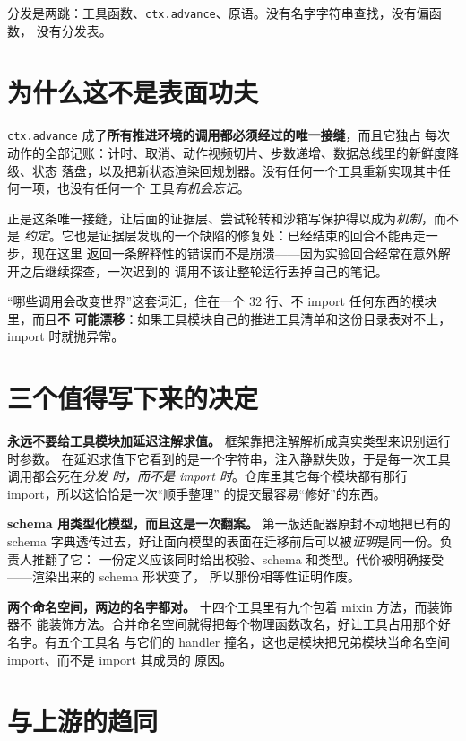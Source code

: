 \documentclass[11pt,a4paper,UTF8,fontset=macnew]{ctexrep}
\newcommand{\keyrule}[1]{\textbf{\textcolor{acc}{#1}}}
\begin{document}
\noindent
分发是两跳：工具函数、\texttt{ctx.advance}、原语。没有名字字符串查找，没有偏函数，
没有分发表。

\section{为什么这不是表面功夫}

\texttt{ctx.advance} 成了\textbf{所有推进环境的调用都必须经过的唯一接缝}，而且它独占
每次动作的全部记账：计时、取消、动作视频切片、步数递增、数据总线里的新鲜度降级、状态
落盘，以及把新状态渲染回规划器。没有任何一个工具重新实现其中任何一项，也没有任何一个
工具\emph{有机会忘记}。

正是这条唯一接缝，让后面的证据层、尝试轮转和沙箱写保护得以成为\emph{机制}，而不是
\emph{约定}。它也是证据层发现的一个缺陷的修复处：已经结束的回合不能再走一步，现在这里
返回一条解释性的错误而不是崩溃——因为实验回合经常在意外解开之后继续探查，一次迟到的
调用不该让整轮运行丢掉自己的笔记。

“哪些调用会改变世界”这套词汇，住在一个 32 行、不 import 任何东西的模块里，而且\textbf{不
可能漂移}：如果工具模块自己的推进工具清单和这份目录表对不上，import 时就抛异常。

\section{三个值得写下来的决定}

\keyrule{永远不要给工具模块加延迟注解求值。} 框架靠把注解解析成真实类型来识别运行时参数。
在延迟求值下它看到的是一个字符串，注入静默失败，于是每一次工具调用都会死在\emph{分发
时，而不是 import 时}。仓库里其它每个模块都有那行 import，所以这恰恰是一次“顺手整理”
的提交最容易“修好”的东西。

\keyrule{schema 用类型化模型，而且这是一次翻案。} 第一版适配器原封不动地把已有的 schema
字典透传过去，好让面向模型的表面在迁移前后可以被\emph{证明}是同一份。负责人推翻了它：
一份定义应该同时给出校验、schema 和类型。代价被明确接受——渲染出来的 schema 形状变了，
所以那份相等性证明作废。

\keyrule{两个命名空间，两边的名字都对。} 十四个工具里有九个包着 mixin 方法，而装饰器不
能装饰方法。合并命名空间就得把每个物理函数改名，好让工具占用那个好名字。有五个工具名
与它们的 handler 撞名，这也是模块把兄弟模块当命名空间 import、而不是 import 其成员的
原因。

\section{与上游的趋同}
\end{document}
